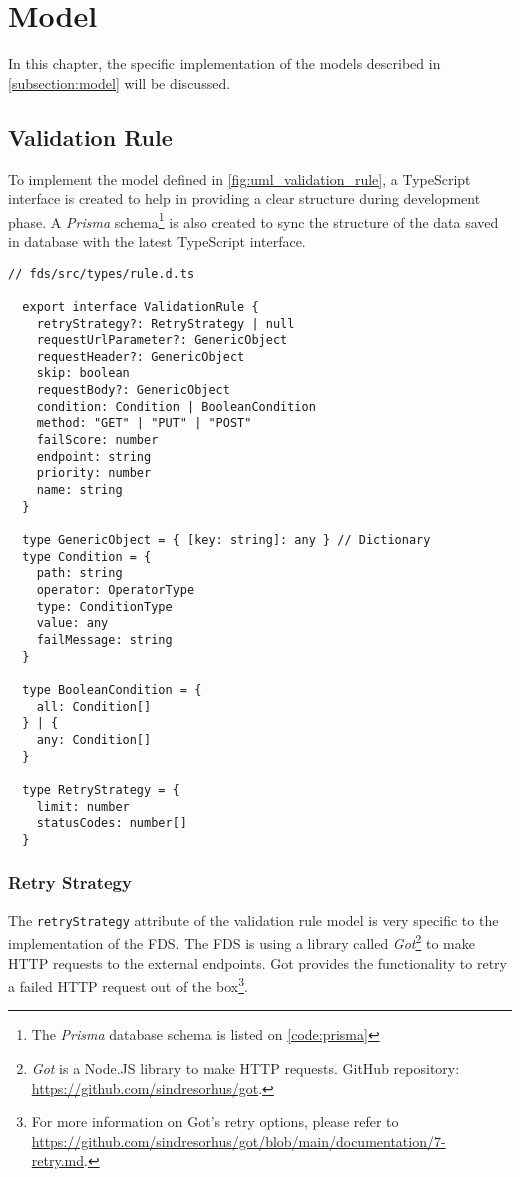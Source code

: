\section{Model}

In this chapter, the specific implementation of the models described in \autoref{subsection:model} will be discussed. 

  \subsection{Validation Rule}
    To implement the model defined in \autoref{fig:uml_validation_rule}, a TypeScript interface is created to help in providing a clear structure during development phase. A \emph{Prisma} schema\footnote{The \emph{Prisma} database schema is listed on \autoref{code:prisma}} is also created to sync the structure of the data saved in database with the latest TypeScript interface. 

    \begin{lstlisting}[style=es6, caption={TypeScript interface of a validation rule (TypeScript)}]
  // fds/src/types/rule.d.ts
  
  export interface ValidationRule {
    retryStrategy?: RetryStrategy | null
    requestUrlParameter?: GenericObject
    requestHeader?: GenericObject
    skip: boolean
    requestBody?: GenericObject
    condition: Condition | BooleanCondition
    method: "GET" | "PUT" | "POST" 
    failScore: number
    endpoint: string
    priority: number
    name: string
  }
  
  type GenericObject = { [key: string]: any } // Dictionary
  type Condition = {
    path: string
    operator: OperatorType
    type: ConditionType
    value: any
    failMessage: string
  }

  type BooleanCondition = {
    all: Condition[]
  } | {
    any: Condition[]
  }

  type RetryStrategy = {
    limit: number
    statusCodes: number[] 
  }
    \end{lstlisting}
 
    \subsubsection{Retry Strategy}
  The \verb;retryStrategy; attribute of the validation rule model is very specific to the implementation of the FDS. The FDS is using a library called \emph{Got}\footnote{\emph{Got} is a Node.JS library to make HTTP requests. GitHub repository: \url{https://github.com/sindresorhus/got}.} to make HTTP requests to the external endpoints. Got provides the functionality to retry a failed HTTP request out of the box\footnote{For more information on Got's retry options, please refer to \url{https://github.com/sindresorhus/got/blob/main/documentation/7-retry.md}.}.

